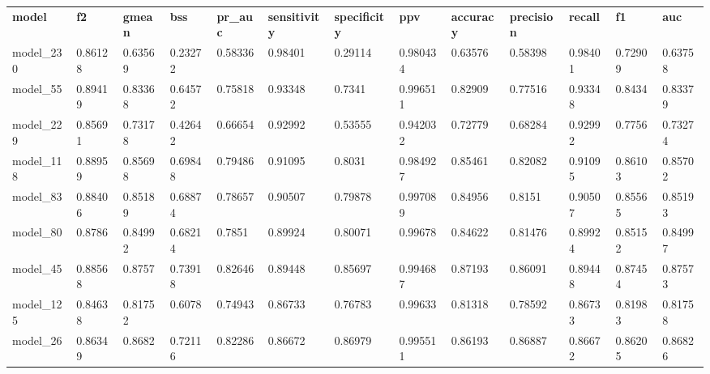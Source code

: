 \begin{tabular}{lllllllllllll}
\textbf{model} & \textbf{f2} & \textbf{gmean} & \textbf{bss} & \textbf{pr\_auc} & \textbf{sensitivity} & \textbf{specificity} & \textbf{ppv} & \textbf{accuracy} & \textbf{precision} & \textbf{recall} & \textbf{f1} & \textbf{auc} \\
model\_230     & 0.86128     & 0.63569        & 0.23272      & 0.58336          & 0.98401              & 0.29114              & 0.980434     & 0.63576           & 0.58398            & 0.98401         & 0.72909     & 0.63758      \\
model\_55      & 0.89419     & 0.83368        & 0.64572      & 0.75818          & 0.93348              & 0.7341               & 0.996511     & 0.82909           & 0.77516            & 0.93348         & 0.8434      & 0.83379      \\
model\_229     & 0.85691     & 0.73178        & 0.42642      & 0.66654          & 0.92992              & 0.53555              & 0.942032     & 0.72779           & 0.68284            & 0.92992         & 0.7756      & 0.73274      \\
model\_118     & 0.88959     & 0.85698        & 0.69848      & 0.79486          & 0.91095              & 0.8031               & 0.984927     & 0.85461           & 0.82082            & 0.91095         & 0.86103     & 0.85702      \\
model\_83      & 0.88406     & 0.85189        & 0.68874      & 0.78657          & 0.90507              & 0.79878              & 0.997089     & 0.84956           & 0.8151             & 0.90507         & 0.85565     & 0.85193      \\
model\_80      & 0.8786      & 0.84992        & 0.68214      & 0.7851           & 0.89924              & 0.80071              & 0.99678      & 0.84622           & 0.81476            & 0.89924         & 0.85152     & 0.84997      \\
model\_45      & 0.88568     & 0.8757         & 0.73918      & 0.82646          & 0.89448              & 0.85697              & 0.994687     & 0.87193           & 0.86091            & 0.89448         & 0.87454     & 0.87573      \\
model\_125     & 0.84638     & 0.81752        & 0.6078       & 0.74943          & 0.86733              & 0.76783              & 0.99633      & 0.81318           & 0.78592            & 0.86733         & 0.81983     & 0.81758      \\
model\_26      & 0.86349     & 0.8682         & 0.72116      & 0.82286          & 0.86672              & 0.86979              & 0.995511     & 0.86193           & 0.86887            & 0.86672         & 0.86205     & 0.86826      \\

\end{tabular}
